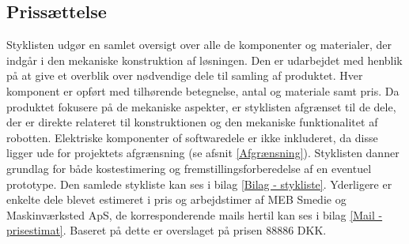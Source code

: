 \subsection{Prissættelse} \label{Stykliste}
Styklisten udgør en samlet oversigt over alle de komponenter og materialer, der indgår i den mekaniske konstruktion af løsningen. Den er udarbejdet med henblik på at give et overblik over nødvendige dele til samling af produktet. Hver komponent er opført med tilhørende betegnelse, antal og  materiale samt pris. Da produktet fokusere på de mekaniske aspekter, er styklisten afgrænset til de dele, der er direkte relateret til konstruktionen og den mekaniske funktionalitet af robotten. Elektriske komponenter of softwaredele er ikke inkluderet, da disse ligger ude for projektets afgrænsning (se afsnit \ref{Afgrænsning}). Styklisten danner grundlag for både kostestimering og fremstillingsforberedelse af en eventuel prototype. Den samlede stykliste kan ses i bilag \ref{Bilag - stykliste}. Yderligere er enkelte dele blevet estimeret i pris og arbejdstimer af MEB Smedie og Maskinværksted ApS, de korresponderende mails hertil kan ses i bilag \ref{Mail - prisestimat}. Baseret på dette er overslaget på prisen 88886 DKK.




